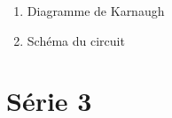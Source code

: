 \documentclass[letter, oneside]{book}
\begin{document}
\begin{itemize}
\begin{itemize}
\begin{enumerate}
\item Diagramme de Karnaugh
\begin{center}

\end{center}

\item Schéma du circuit
\begin{center}

\end{center}
\end{enumerate}
\end{itemize}
\end{itemize}

\section*{Série 3}
\label{sec:orgee2fd3e}
\end{document}
